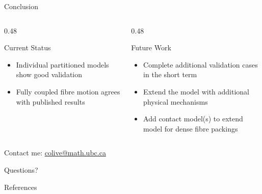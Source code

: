 \documentclass[10pt,english]{beamer}
\begin{document}
\begin{frame}{Conclusion}
    \begin{columns}[T,onlytextwidth]
        \begin{column}{0.48\textwidth}
            \begin{block}{Current Status}
                \begin{minipage}[t][0.38\textheight][t]{\linewidth}
                    \begin{itemize}
                        \item Individual partitioned models show good
                              validation
                        \item Fully coupled fibre motion agrees with published
                              results
                    \end{itemize}
                \end{minipage}
            \end{block}
        \end{column}
        \begin{column}{0.48\textwidth}
            \begin{block}{Future Work}
                \begin{minipage}[t][0.38\textheight][t]{\linewidth}
                    \begin{itemize}
                        \item Complete additional validation cases in the short
                              term
                        \item Extend the model with additional physical
                              mechanisms
                        \item Add contact model(s) to extend model for dense
                              fibre packings
                    \end{itemize}
                \end{minipage}
            \end{block}
        \end{column}
    \end{columns}

    \vfill
    Contact me: \href{mailto:colive@math.ubc.ca}{colive@math.ubc.ca}
\end{frame}

\begin{frame}
    \centering
    \vfill
    {
        Questions?
    }
    \vfill
\end{frame}

\begin{frame}[allowframebreaks]{References}
    \printbibliography[heading=none]
\end{frame}
\end{document}
